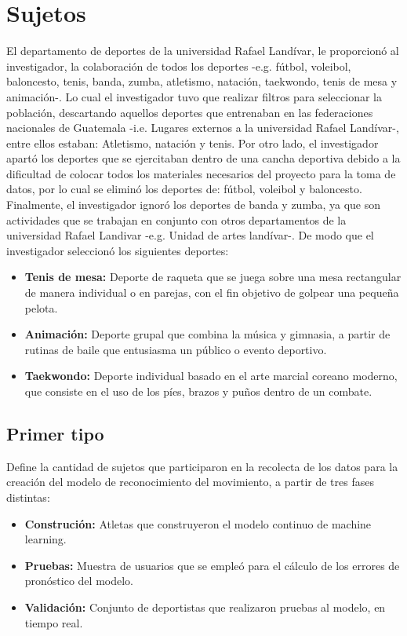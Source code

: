 \section{Sujetos}
El departamento de deportes de la universidad Rafael Land\'ivar, le proporcion\'o al investigador, la colaboraci\'on de todos los deportes -e.g. f\'utbol, voleibol, baloncesto, tenis, banda, zumba, atletismo, nataci\'on, taekwondo, tenis de mesa y animaci\'on-. Lo cual el investigador tuvo que realizar filtros para seleccionar la poblaci\'on, descartando aquellos deportes que entrenaban en las federaciones nacionales de Guatemala -i.e. Lugares externos a la universidad Rafael Land\'ivar-, entre ellos estaban: Atletismo, nataci\'on y tenis. Por otro lado, el investigador apart\'o los deportes que se ejercitaban dentro de una cancha deportiva debido a la dificultad de colocar todos los materiales necesarios del proyecto para la toma de datos, por lo cual se elimin\'o los deportes de:  f\'utbol, voleibol y baloncesto. Finalmente, el investigador ignor\'o los deportes de banda y zumba, ya que son actividades que se trabajan en conjunto con otros departamentos de la universidad Rafael Landivar -e.g. Unidad de artes land\'ivar-. De modo que el investigador seleccion\'o los siguientes deportes:
\begin{itemize}
	\item \textbf{Tenis de mesa:} Deporte de raqueta que se juega sobre una mesa rectangular de manera individual o en parejas, con el fin objetivo de golpear una peque\~na pelota.
	\item \textbf{Animaci\'on:} Deporte grupal que combina la m\'usica y gimnasia, a partir de rutinas de baile que entusiasma un p\'ublico o evento deportivo.
	\item \textbf{Taekwondo:} Deporte individual basado en el arte marcial coreano moderno, que consiste en el uso de los p\'ies, brazos y pu\~nos dentro de un combate.
\end{itemize}
\subsection{Primer tipo} \label{sj:1t}
Define la cantidad de sujetos que participaron en la recolecta de los datos para la creaci\'on del modelo de reconocimiento del movimiento, a partir de tres fases distintas:
\begin{itemize}
	\item \textbf{Construci\'on:} Atletas que construyeron el modelo continuo de machine learning.
	\item \textbf{Pruebas:} Muestra de usuarios que se emple\'o para el c\'alculo de los errores de pron\'ostico del modelo.
	\item \textbf{Validaci\'on:} Conjunto de deportistas que realizaron pruebas al modelo, en tiempo real.
\end{itemize}
